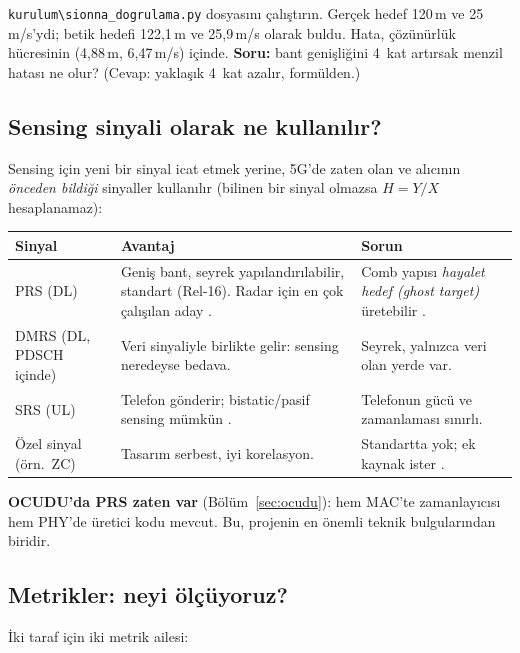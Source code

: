 \begin{pilot}
\texttt{kurulum\textbackslash sionna\_dogrulama.py} dosyasını çalıştırın. Gerçek hedef 120\,m ve 25\,m/s'ydi; betik hedefi 122,1\,m ve 25,9\,m/s olarak buldu.
Hata, çözünürlük hücresinin (4,88\,m, 6,47\,m/s) içinde. \textbf{Soru:} bant genişliğini 4~kat artırsak menzil hatası ne olur? (Cevap: yaklaşık 4~kat azalır, formülden.)
\end{pilot}

\subsection{Sensing sinyali olarak ne kullanılır?}\label{sec:sinyal}

Sensing için yeni bir sinyal icat etmek yerine, 5G'de zaten olan ve alıcının \emph{önceden bildiği} sinyaller kullanılır
(bilinen bir sinyal olmazsa $H=Y/X$ hesaplanamaz):

\begingroup\sffamily\small
\begin{xltabular}{\textwidth}{@{}p{2cm}XX@{}}
\toprule
\textbf{Sinyal} & \textbf{Avantaj} & \textbf{Sorun} \\
\midrule
PRS (DL) & Geniş bant, seyrek yapılandırılabilir, standart (Rel-16). Radar için en çok çalışılan aday \cite{wei,nist,khos}. & Comb yapısı \emph{hayalet hedef (ghost target)} üretebilir \cite{khos}. \\
DMRS (DL, PDSCH içinde) & Veri sinyaliyle birlikte gelir: sensing neredeyse bedava. & Seyrek, yalnızca veri olan yerde var. \\
SRS (UL) & Telefon gönderir; bistatic/pasif sensing mümkün \cite{gurung}. & Telefonun gücü ve zamanlaması sınırlı. \\
Özel sinyal (örn.\ ZC) & Tasarım serbest, iyi korelasyon. & Standartta yok; ek kaynak ister \cite{dickerson}. \\
\bottomrule
\end{xltabular}
\endgroup

\textbf{OCUDU'da PRS zaten var} (Bölüm~\ref{sec:ocudu}): hem MAC'te zamanlayıcısı hem PHY'de üretici kodu mevcut. Bu, projenin en önemli teknik bulgularından biridir.

\subsection{Metrikler: neyi ölçüyoruz?}\label{sec:metrik}

İki taraf için iki metrik ailesi:


